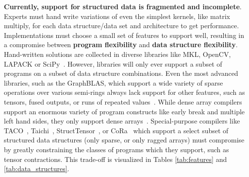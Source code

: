 %
\textbf{Currently, support for structured data is fragmented and incomplete}.
%
Experts must hand write variations of even the simplest kernels, like matrix
multiply, for each data structure/data set and architecture to get performance.
%
Implementations must choose a small set of features to support well, resulting
in a compromise between \textbf{program flexibility} and \textbf{data structure
flexibility}.
%
Hand-written solutions are collected in diverse libraries like
MKL, OpenCV, LAPACK or SciPy~\cite{ bradski2000opencv, anderson1999lapack, virtanen2020scipy, psarras2022linear}. 
%
However, libraries will only ever support a subset of
programs on a subset of data structure combinations.
%
Even the most advanced
libraries, such as the GraphBLAS, which support a wide variety of sparse
operations over various semi-rings always lack support for other features, such
as tensors, fused outputs, or runs of repeated values~\cite{bulucc2017design, mattson2019lagraph}.
%
While dense array
compilers support an enormous variety of program constructs like early break and
multiple left hand sides, they only support dense arrays~\cite{ragan-kelley_halide_2013,grosser2012polly}.  
%
Special-purpose
compilers like TACO~\cite{kjolstad_tensor_2019}, Taichi~\cite{hu_taichi_2019}, StructTensor~\cite{ghorbani2023compiling}, or CoRa~\cite{fegade_cora_2022} which support a select subset of structured data
structures (only sparse, or only ragged arrays) must compromise by greatly
constraining the classes of programs which they support, such as tensor
contractions.
%
This trade-off is visualized in Tables \ref{tab:features} and \ref{tab:data_structures}.
%

\newcommand*\rot{\rotatebox{90}}


